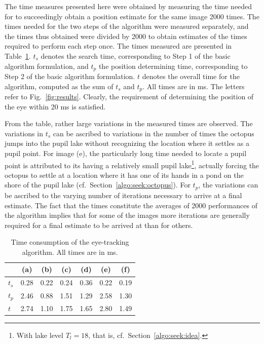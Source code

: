 The time measures presented here were obtained by measuring the time
needed for {\octopus} to succeedingly obtain a position estimate for
the same image 2000 times.  The times needed for the two steps of the
algorithm were measured separately, and the times thus obtained were
divided by 2000 to obtain estimates of the times required to perform
each step once.  The times measured are presented in
Table~\ref{tab:time}.  $t_{s}$ denotes the search time, corresponding
to Step 1 of the basic algorithm formulation, and $t_{p}$ the position
determining time, corresponding to Step 2 of the basic algorithm
formulation.  $t$ denotes the overall time for the algorithm, computed
as the sum of $t_{s}$ and $t_{p}$.  All times are in ms.  The letters
refer to Fig.~\ref{fig:results}.  Clearly, the requirement of
determining the position of the eye within 20 ms is satisfied.

From the table, rather large variations in the measured times are
observed.  The variations in $t_{s}$ can be ascribed to variations in
the number of times the octopus jumps into the pupil lake without
recognizing the location where it settles as a pupil point.  For image
(e), the particularly long time needed to locate a pupil point is
attributed to its having a relatively small pupil lake\footnote{With
  lake level $T_{l}=18$, that is, cf.\ Section~\ref{algo:seek:idea}.},
actually forcing the octopus to settle at a location where it has one
of its hands in a pond on the shore of the pupil lake (cf.\ 
Section~\ref{algo:seek:octopus}).  For $t_{p}$, the variations can be
ascribed to the varying number of iterations necessary to arrive at a
final estimate.  The fact that the times constitute the averages of
2000 performances of the algorithm implies that for some of the images
more iterations are generally required for a final estimate to be
arrived at than for others.  

\begin{table}[tb]
  \begin{center}
    \begin{tabular}{|l||c|c|c|c|c|c|}                      \hline
              & (a)  & (b)  & (c)  & (d)  & (e)  & (f)  \\ \hline\hline
      $t_{s}$ & 0.28 & 0.22 & 0.24 & 0.36 & 0.22 & 0.19 \\ \hline
      $t_{p}$ & 2.46 & 0.88 & 1.51 & 1.29 & 2.58 & 1.30 \\ \hline
      $t$     & 2.74 & 1.10 & 1.75 & 1.65 & 2.80 & 1.49 \\ \hline
    \end{tabular}
  \end{center}
  \caption{\label{tab:time}Time consumption of the {\octopus}
    eye-tracking algorithm.  All times are in ms.}
\end{table}

